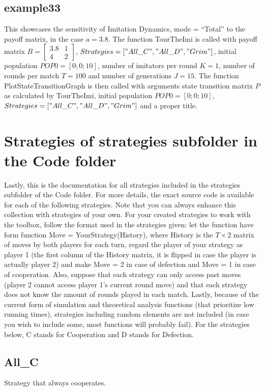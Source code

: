 \subsection{example33}
This showcases the sensitivity of Imitation Dynamics, mode = ``Total'' to the payoff matrix, in the case $a = 3.8$. The function TourTheImi is called with payoff matrix $B = \begin{bmatrix} 3.8 & 1 \\ 4 & 2 \end{bmatrix}$, $Strategies = ["All\_C", "All\_D", "Grim"]$, initial population $POP0 = [0; 0; 10]$, number of imitators per round $K=1$, number of rounds per match $T = 100$ and number of generations $J = 15$. The function PlotStateTransitionGraph is then called with arguments state transition matrix $P$ as calculated by TourTheImi, initial population $POP0 = [0; 0; 10]$, $Strategies = ["All\_C", "All\_D", "Grim"]$ and a proper title.

\section{Strategies of strategies subfolder in the Code folder}
Lastly, this is the documentation for all strategies included in the strategies subfolder of the Code folder. For more details, the exact source code is available for each of the following strategies. Note that you can always enhance this collection with strategies of your own. For your created strategies to work with the toolbox, follow the format used in the strategies given: let the function have form function Move = YourStrategy(History), where History is the $T \times 2$ matrix of moves by both players for each turn, regard the player of your strategy as player 1 (the first column of the History matrix, it is flipped in case the player is actually player 2) and make Move = 2 in case of defection and Move = 1 in case of cooperation. Also, suppose that each strategy can only access past moves (player 2 cannot access player 1's current round move) and that each strategy does not know the amount of rounds played in each match. Lastly, because of the current form of simulation and theoretical analysis functions (that prioritize low running times), strategies including random elements are not included (in case you wish to include some, most functions will probably fail). For the strategies below, C stands for Cooperation and D stands for Defection.

\subsection{All\_C}
Strategy that always cooperates.

